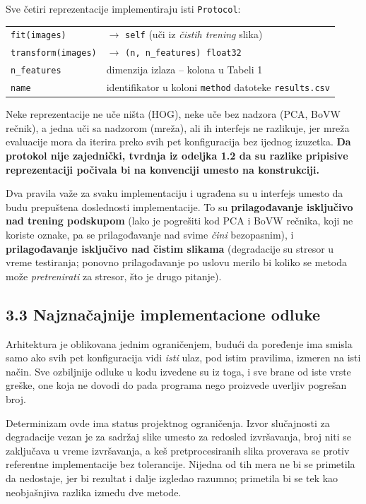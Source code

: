 \documentclass[11pt,a4paper]{article}
\begin{document}
Sve četiri reprezentacije implementiraju isti \texttt{Protocol}:

\begin{center}
\begin{tabular}{ll}
\texttt{fit(images)} & $\rightarrow$ \texttt{self} \quad (uči iz \emph{čistih trening} slika) \\
\texttt{transform(images)} & $\rightarrow$ \texttt{(n, n\_features) float32} \\
\texttt{n\_features} & dimenzija izlaza -- kolona u Tabeli 1 \\
\texttt{name} & identifikator u koloni \texttt{method} datoteke \texttt{results.csv} \\
\end{tabular}
\end{center}

Neke reprezentacije ne uče ništa (HOG), neke uče bez nadzora (PCA, BoVW rečnik), a jedna uči sa
nadzorom (mreža), ali ih interfejs ne razlikuje, jer mreža evaluacije mora da iterira preko svih
pet konfiguracija bez ijednog izuzetka. \textbf{Da protokol nije zajednički, tvrdnja iz odeljka
1.2 da su razlike pripisive reprezentaciji počivala bi na konvenciji umesto na konstrukciji.}

Dva pravila važe za svaku implementaciju i ugrađena su u interfejs umesto da budu prepuštena doslednosti implementacije. To su
\textbf{prilagođavanje isključivo nad trening podskupom} (lako je pogrešiti kod PCA i BoVW
rečnika, koji ne koriste oznake, pa se prilagođavanje nad svime \emph{čini} bezopasnim), i
\textbf{prilagođavanje isključivo nad čistim slikama} (degradacije su stresor u vreme testiranja;
ponovno prilagođavanje po uslovu merilo bi koliko se metoda može \emph{pretrenirati} za stresor,
što je drugo pitanje).

\subsection*{3.3 Najznačajnije implementacione odluke}

Arhitektura je oblikovana jednim ograničenjem, budući da poređenje ima smisla samo ako svih pet
konfiguracija vidi \emph{isti} ulaz, pod istim pravilima, izmeren na isti način. Sve ozbiljnije
odluke u kodu izvedene su iz toga, i sve brane od iste vrste greške, one koja ne dovodi do pada programa nego
proizvede uverljiv pogrešan broj.

Determinizam ovde ima status projektnog ograničenja. Izvor slučajnosti za degradacije
vezan je za sadržaj slike umesto za redosled izvršavanja, broj niti se zaključava u vreme
izvršavanja, a keš pretprocesiranih slika proverava se protiv referentne implementacije bez
tolerancije. Nijedna od tih mera ne bi se primetila da nedostaje, jer bi rezultat i dalje
izgledao razumno; primetila bi se tek kao neobjašnjiva razlika između dve metode.
\end{document}
